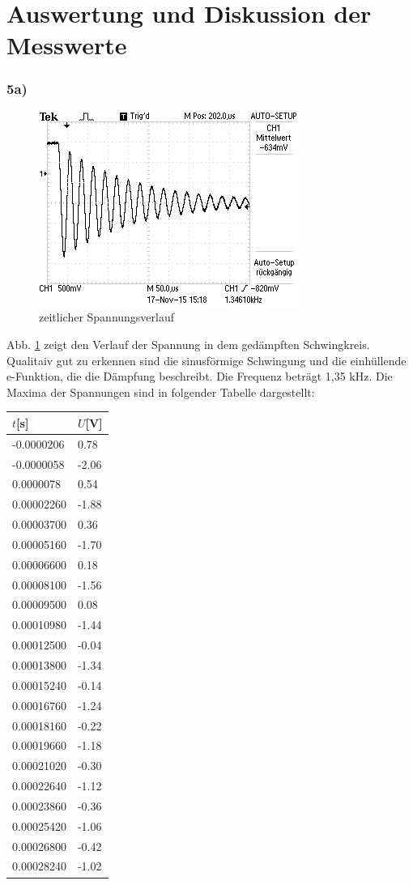 \section{Auswertung und Diskussion der Messwerte}
\label{sec:Auswertung}

\subsubsection{5a)}
\begin{figure}
  \centering
  \includegraphics{data/F0000TEK.jpg}
  \caption{zeitlicher Spannungsverlauf}
  \label{fig:5aergebnis}
\end{figure}
Abb. \ref{fig:5aergebnis} zeigt den Verlauf der Spannung in dem gedämpften
Schwingkreis. Qualitaiv gut zu erkennen sind die sinusförmige Schwingung und
die einhüllende e-Funktion, die die Dämpfung beschreibt.
Die Frequenz beträgt 1,35 kHz.
Die Maxima der Spannungen sind in folgender Tabelle dargestellt:
\begin{center}
\noindent
\label{tab:5a}
\begin{tabular}{ll}
\toprule
{$t$[s]} & {$U$[V]} \\
\midrule
-0.0000206 & 0.78 \\
-0.0000058 & -2.06 \\
0.0000078 & 0.54 \\
0.00002260 & -1.88 \\
0.00003700 & 0.36 \\
0.00005160 & -1.70 \\
0.00006600 & 0.18 \\
0.00008100 & -1.56 \\
0.00009500 & 0.08 \\
0.00010980 & -1.44 \\
0.00012500 & -0.04 \\
0.00013800 & -1.34 \\
0.00015240 & -0.14 \\
0.00016760 & -1.24 \\
0.00018160 & -0.22 \\
0.00019660 & -1.18 \\
0.00021020 & -0.30 \\
0.00022640 & -1.12 \\
0.00023860 & -0.36 \\
0.00025420 & -1.06 \\
0.00026800 & -0.42 \\
0.00028240 & -1.02 \\
\bottomrule
\end{tabular}
\end{center}

